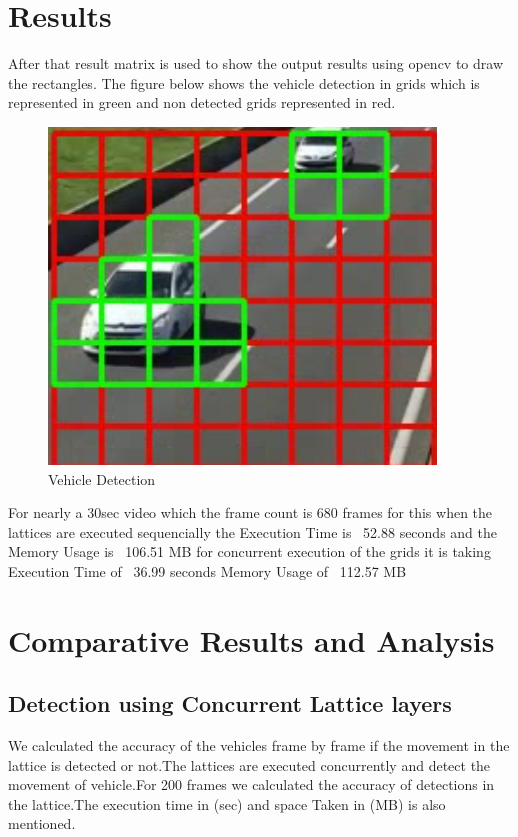 \documentclass[conference]{IEEEtran}
\begin{document}
\section{Results}
After that result matrix is used to show the output results using opencv to draw the rectangles.
The figure below shows the vehicle detection in grids which is represented in green and non detected grids represented in red.

\begin{figure}[h]
    \centering
    \includegraphics[width=0.6\linewidth]{result1.png}
    \caption{Vehicle Detection}
    \label{fig:vehicle-detection}
\end{figure}

For nearly a 30sec video which the frame count is 680 frames for this when the lattices are executed sequencially the Execution Time is ~52.88 seconds and the Memory Usage is ~106.51 MB for concurrent execution of the grids it is taking Execution Time of ~36.99 seconds Memory Usage of ~112.57 MB



\section{Comparative Results and Analysis}
\subsection{Detection using Concurrent Lattice layers}
We calculated the accuracy of the vehicles frame by frame if the movement in the lattice is detected or not.The lattices are executed concurrently and detect the movement of vehicle.For 200 frames we calculated the accuracy of detections in the lattice.The execution time in (sec) and space Taken in (MB) is also mentioned.
\end{document}
